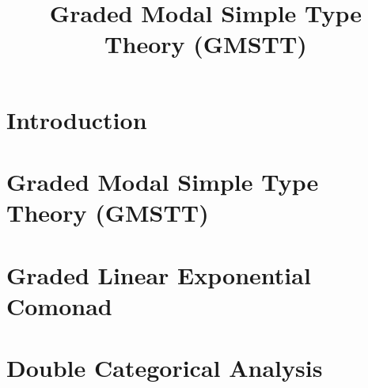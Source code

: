 \documentclass{article}
\begin{document}
\title{Graded Modal Simple Type Theory (GMSTT)}
\maketitle

\section{Introduction}
\label{sec:introduction}


\section{Graded Modal Simple Type Theory (GMSTT)}
\label{sec:graded_modal_simple_type_theory}


\section{Graded Linear Exponential Comonad}
\label{sec:graded_linear_exponential_comonad}

\section{Double Categorical Analysis}
\label{sec:double_categorical_analysis}

\end{document}
